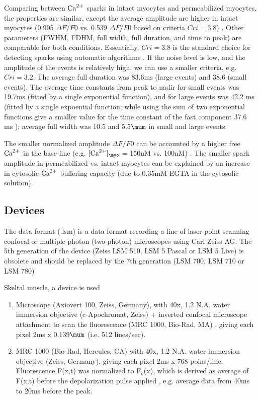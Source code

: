 Comparing between ${\text{Ca}^{2+}}$ sparks in intact myocytes and permeabilized myocytes,
the properties are similar, except the average amplitude are higher in intact
myocytes (0.905 $\Delta F/F0$ vs. 0.539 $\Delta F/F0$ based on criteria
$Cri=3.8$) \citep{picht2007}. Other parameters (FWHM, FDHM, full width, full
duration, and time to peak) are comparable for both conditions. Essentially,
$Cri=3.8$ is the standard choice for detecting sparks using automatic algorithms
\citep{cheng1999, picht2007}. If the noise level is low, and the amplitude of
the events is relatively high, we can use a smaller criteria, e.g. $Cri=3.2$.
The average full duration was 83.6ms (large events) and 38.6 (small events). The
average time constants from peak to nadir for small events was 19.7ms (fitted by
a single exponential function), and for large events was 42.2 ms (fitted by a
single expoential function; while using the sum of two exponential functions
give a smaller value for the time constant of the fast component 37.6 ms
\citep{gordienko2002}); average full width was 10.5 and 5.5$\mum$ in small and large events.

The smaller normalized amplitude $\Delta F/F0$ can be accounted by a higher free
${\text{Ca}^{2+}}$ in the base-line (e.g. $[\Ca]_\myo$ = 150nM vs. 100nM) \citep{picht2007}.
The smaller spark amplitude in permeabilized vs. intact myocytes can be
explained by an increase in cytosolic ${\text{Ca}^{2+}}$ buffering capacity (due to 0.35mM
EGTA in the cytosolic solution).



\subsection{Devices}

\begin{framed}
The data format (.lsm) is a data format recording a line of laser point
scanning confocal or multiple-photon (two-photon) microscopes using Carl Zeiss
AG. The 5th generation of the device (Zeiss LSM 510, LSM 5 Pascal or LSM 5 Live)
is obsolete and should be replaced by the 7th generation (LSM 700, LSM 710 or LSM 780)
\end{framed}


Skeltal muscle, a device is used
\begin{enumerate}
  \item Microscope (Axiovert 100, Zeiss, Germany), with 40x, 1.2 N.A.
  water immersion objective (c-Apochromat, Zeiss) + inverted confocal microscope
  attachment to scan the fluorescence (MRC 1000, Bio-Rad, MA)
  \citep{cheng1999}, giving each pixel 2ms x 0.139$\mum$ (i.e. 512 lines/sec).
  
  \item MRC 1000 (Bio-Rad, Hercules, CA) with 40x, 1.2 N.A. water immersion
  objective (Zeiss, Germany), giving each pixel 2ms x 768 poins/line.
  Fluorescence F(x,t) was normalized to F$_o$(x), which is derived as average of
  F(x,t) before the depolarization pulse applied \citep{rios2001}, e.g. average
  data from 40ms to 20ms before the peak.
   
\end{enumerate}

